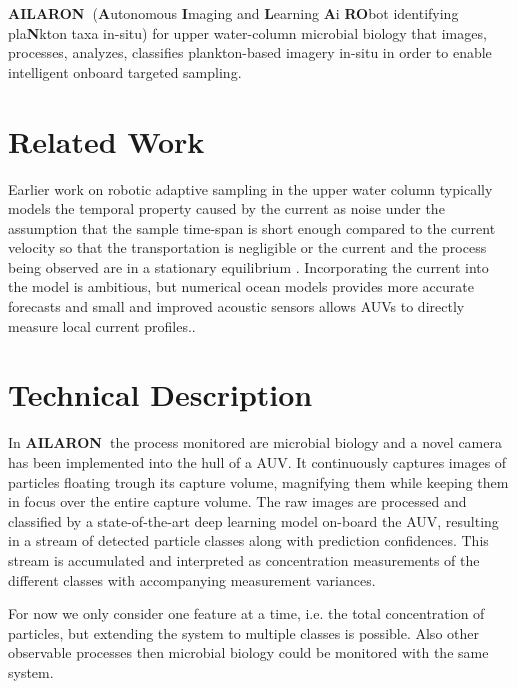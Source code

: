 \documentclass[conference]{IEEEtran}
\def\proj{{\textbf{AILARON\ }}}
\newcommand{\cmt}[1]{{\color{red}{#1}}}
\begin{document}
\proj (\textbf{A}utonomous \textbf{I}maging and \textbf{L}earning
\textbf{A}i \textbf{RO}bot identifying pla\textbf{N}kton taxa in-situ)
for upper water-column microbial biology that images, processes,
analyzes, classifies plankton-based imagery in-situ in order to enable
intelligent onboard targeted sampling.


\section{Related Work}

Earlier work on robotic adaptive sampling in the upper water column
typically models the temporal property caused by the current as noise
under the assumption that the sample time-span is short enough
compared to the current velocity so that the transportation is
negligible or the current and the process being observed are in a
stationary equilibrium \cite{fossum18b}.  Incorporating the current into the model is
ambitious, but numerical ocean models provides more accurate forecasts
and small and improved acoustic sensors allows AUVs to directly
measure local current profiles.\cmt{give citations with a bibliography}.



\section{Technical Description}

In \proj the process monitored are microbial biology and a novel
camera has been implemented into the hull of a AUV.  It continuously
captures images of particles floating trough its capture volume,
magnifying them while keeping them in focus over the entire capture
volume.  The raw images are processed and classified by a
state-of-the-art deep learning model on-board the AUV, resulting in a
stream of detected particle classes along with prediction confidences.
This stream is accumulated and interpreted as concentration
measurements of the different classes with accompanying measurement
variances.

For now we only consider one feature at a time, i.e. the total
concentration of particles, but extending the system to multiple
classes is possible.  Also other observable processes then microbial
biology could be monitored with the same system.
\end{document}
